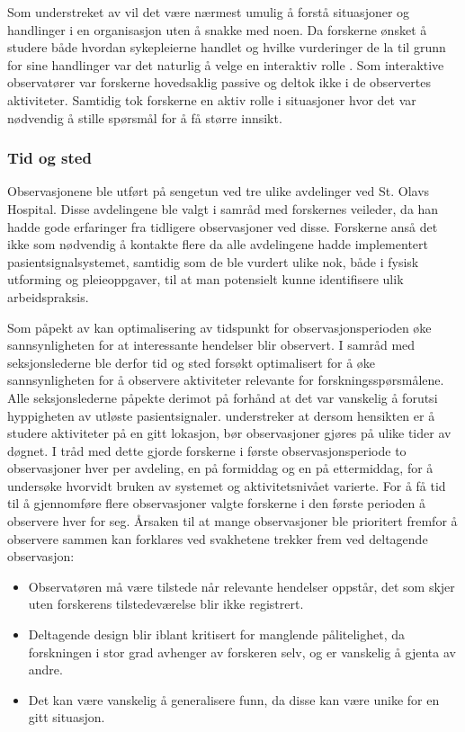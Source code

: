\noindent
Som understreket av \citet{Myers13} vil det være nærmest umulig å forstå situasjoner og handlinger i en organisasjon uten å snakke med noen. Da forskerne ønsket å studere både hvordan sykepleierne handlet og hvilke vurderinger de la til grunn for sine handlinger var det naturlig å velge en interaktiv rolle \citep{Tjora}. Som interaktive observatører var forskerne hovedsaklig passive og deltok ikke i de observertes aktiviteter. Samtidig tok forskerne en aktiv rolle i situasjoner hvor det var nødvendig å stille spørsmål for å få større innsikt.
 
\subsubsection{Tid og sted}
Observasjonene ble utført på sengetun ved tre ulike avdelinger ved St. Olavs Hospital. Disse avdelingene ble valgt i samråd med forskernes veileder, da han hadde gode erfaringer fra tidligere observasjoner ved disse. Forskerne anså det ikke som nødvendig å kontakte flere da alle avdelingene hadde implementert pasientsignalsystemet, samtidig som de ble vurdert ulike nok, både i fysisk utforming og pleieoppgaver, til at man potensielt kunne identifisere ulik arbeidspraksis.
 
\noindent
Som påpekt av \citet{Millen00} kan optimalisering av tidspunkt for observasjonsperioden øke sannsynligheten for at interessante hendelser blir observert. I samråd med seksjonslederne ble derfor tid og sted forsøkt optimalisert for å øke sannsynligheten for å observere aktiviteter relevante for forskningsspørsmålene. Alle seksjonslederne påpekte derimot på forhånd at det var vanskelig å forutsi hyppigheten av utløste pasientsignaler. \citet{Blomberg93} understreker at dersom hensikten er å studere aktiviteter på en gitt lokasjon, bør observasjoner gjøres på ulike tider av døgnet. I tråd med dette gjorde forskerne i første observasjonsperiode to observasjoner hver per avdeling, en på formiddag og en på ettermiddag, for å undersøke hvorvidt bruken av systemet og aktivitetsnivået varierte. For å få tid til å gjennomføre flere observasjoner valgte forskerne i den første perioden å observere hver for seg. Årsaken til at mange observasjoner ble prioritert fremfor å observere sammen kan forklares ved svakhetene \citet{Oates} trekker frem ved deltagende observasjon: 

\begin{itemize}
\item Observatøren må være tilstede når relevante hendelser oppstår, det som skjer uten forskerens tilstedeværelse blir ikke registrert.
\item Deltagende design blir iblant kritisert for manglende pålitelighet, da forskningen i stor grad avhenger av forskeren selv, og er vanskelig å gjenta av andre.
\item Det kan være vanskelig å generalisere funn, da disse kan være unike for en gitt situasjon.
\end{itemize}

